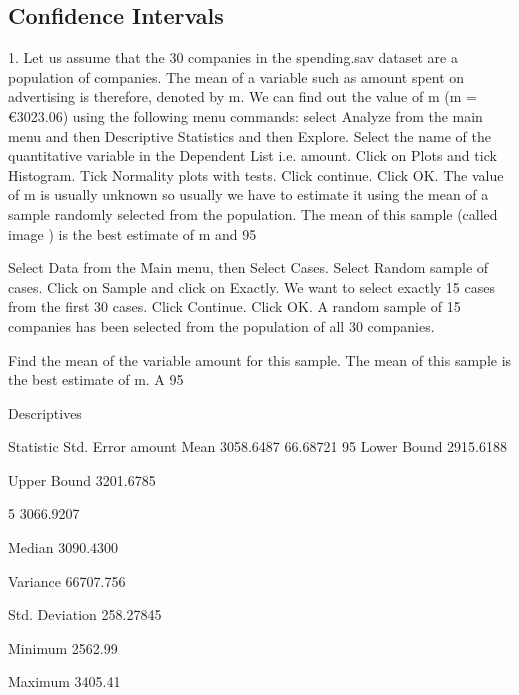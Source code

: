 \subsection{Confidence Intervals}


1. Let us assume that the 30 companies in the spending.sav dataset are a population of companies. The mean of a variable such as amount spent on advertising is therefore, denoted by m. We can find out the value of m (m = €3023.06) using the following menu commands: select Analyze from the main menu and then Descriptive Statistics and then Explore. Select the name of the quantitative variable in the Dependent List i.e. amount. Click on Plots and tick Histogram. Tick Normality plots with tests. Click continue. Click OK.
The value of m is usually unknown so usually we have to estimate it using the mean of a sample randomly selected from the population. The mean of this sample (called image ) is the best estimate of m and 95%

Select Data from the Main menu, then Select Cases. Select Random sample of cases. Click on Sample and click on Exactly. We want to select exactly 15 cases from the first 30 cases. Click Continue. Click OK. A random sample of 15 companies has been selected from the population of all 30 companies.

Find the mean of the variable amount for this sample. The mean of this sample is the best estimate of m. A 95%

Descriptives
 	 	 	
Statistic
Std. Error
amount
Mean
3058.6487
66.68721
95%
Lower Bound
2915.6188
 
Upper Bound
3201.6785
 
5%
3066.9207
 
Median
3090.4300
 
Variance
66707.756
 
Std. Deviation
258.27845
 
Minimum
2562.99
 
Maximum
3405.41
 
